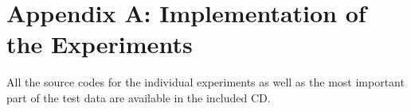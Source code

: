 \chapter*{Appendix A: Implementation of the Experiments}
\label{kap:apendA}

All the source codes for the individual experiments as well as the most important
part of the test data are available in the included CD.
